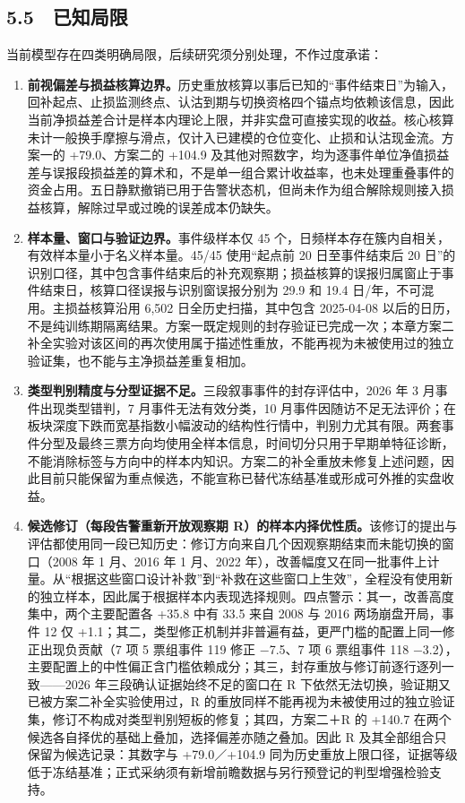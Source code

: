 \documentclass[12pt,a4paper]{ctexart}
\begin{document}
\subsection{5.5　已知局限}
当前模型存在四类明确局限，后续研究须分别处理，不作过度承诺：\par
\begin{enumerate}
\item \textbf{前视偏差与损益核算边界。}历史重放核算以事后已知的“事件结束日”为输入，回补起点、止损监测终点、认沽到期与切换资格四个锚点均依赖该信息，因此当前净损益差合计是样本内理论上限，并非实盘可直接实现的收益。核心核算未计一般换手摩擦与滑点，仅计入已建模的仓位变化、止损和认沽现金流。方案一的 +79.0、方案二的 +104.9 及其他对照数字，均为逐事件单位净值损益差与误报段损益差的算术和，不是单一组合累计收益率，也未处理重叠事件的资金占用。五日静默撤销已用于告警状态机，但尚未作为组合解除规则接入损益核算，解除过早或过晚的误差成本仍缺失。
\item \textbf{样本量、窗口与验证边界。}事件级样本仅 45 个，日频样本存在簇内自相关，有效样本量小于名义样本量。45/45 使用“起点前 20 日至事件结束后 20 日”的识别口径，其中包含事件结束后的补充观察期；损益核算的误报归属窗止于事件结束日，核算口径误报与识别窗误报分别为 29.9 和 19.4 日/年，不可混用。主损益核算沿用 6,502 日全历史扫描，其中包含 2025-04-08 以后的日历，不是纯训练期隔离结果。方案一既定规则的封存验证已完成一次；本章方案二补全实验对该区间的再次使用属于描述性重放，不能再视为未被使用过的独立验证集，也不能与主净损益差重复相加。
\item \textbf{类型判别精度与分型证据不足。}三段叙事事件的封存评估中，2026 年 3 月事件出现类型错判，7 月事件无法有效分类，10 月事件因随访不足无法评价；在板块深度下跌而宽基指数小幅波动的结构性行情中，判别力尤其有限。两套事件分型及最终三票方向均使用全样本信息，时间切分只用于早期单特征诊断，不能消除标签与方向中的样本内知识。方案二的补全重放未修复上述问题，因此目前只能保留为重点候选，不能宣称已替代冻结基准或形成可外推的实盘收益。
\item \textbf{候选修订（每段告警重新开放观察期 R）的样本内择优性质。}该修订的提出与评估都使用同一段已知历史：修订方向来自几个因观察期结束而未能切换的窗口（2008 年 1 月、2016 年 1 月、2022 年），改善幅度又在同一批事件上计量。从“根据这些窗口设计补救”到“补救在这些窗口上生效”，全程没有使用新的独立样本，因此属于根据样本内表现选择规则。四点警示：其一，改善高度集中，两个主要配置各 +35.8 中有 33.5 来自 2008 与 2016 两场崩盘开局，事件 12 仅 +1.1；其二，类型修正机制并非普遍有益，更严门槛的配置上同一修正出现负贡献（7 项 5 票组事件 119 修正 \(-\)7.5、7 项 6 票组事件 118 \(-\)3.2），主要配置上的中性偏正含门槛依赖成分；其三，封存重放与修订前逐行逐列一致——2026 年三段确认证据始终不足的窗口在 R 下依然无法切换，验证期又已被方案二补全实验使用过，R 的重放同样不能再视为未被使用过的独立验证集，修订不构成对类型判别短板的修复；其四，方案二＋R 的 +140.7 在两个候选各自择优的基础上叠加，选择偏差亦随之叠加。因此 R 及其全部组合只保留为候选记录：其数字与 +79.0／+104.9 同为历史重放上限口径，证据等级低于冻结基准；正式采纳须有新增前瞻数据与另行预登记的判型增强检验支持。
\end{enumerate}
\end{document}
